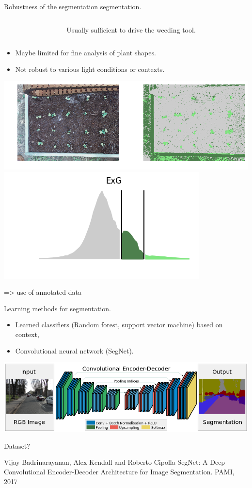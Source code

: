 \begin{frame}{Robustness of the segmentation segmentation.}

\begin{columns}
\begin{column}{0.45\textwidth}
\end{column}
\begin{column}{0.5\textwidth}
Usually sufficient to drive the weeding tool. 
\end{column}
\end{columns}

\begin{itemize}
\item Maybe limited for fine analysis of plant shapes.
\item Not robust to various light conditions or contexts.
\end{itemize}

\includegraphics[width=.65\linewidth]{pics/mask_pb}
\includegraphics[width=.3\linewidth]{pics/trihist2}

=> use of annotated data

\end{frame}

\begin{frame}{Learning methods for segmentation.}

\begin{itemize}
\item Learned classifiers (Random forest, support vector machine) based on context, 
\item Convolutional neural network (SegNet). 
\end{itemize}

\includegraphics[width=\linewidth]{pics/segnet}

Dataset?

\hfill {\tiny  Vijay Badrinarayanan, Alex Kendall and Roberto Cipolla SegNet: A Deep Convolutional Encoder-Decoder Architecture for Image Segmentation. PAMI, 2017}
\end{frame}

